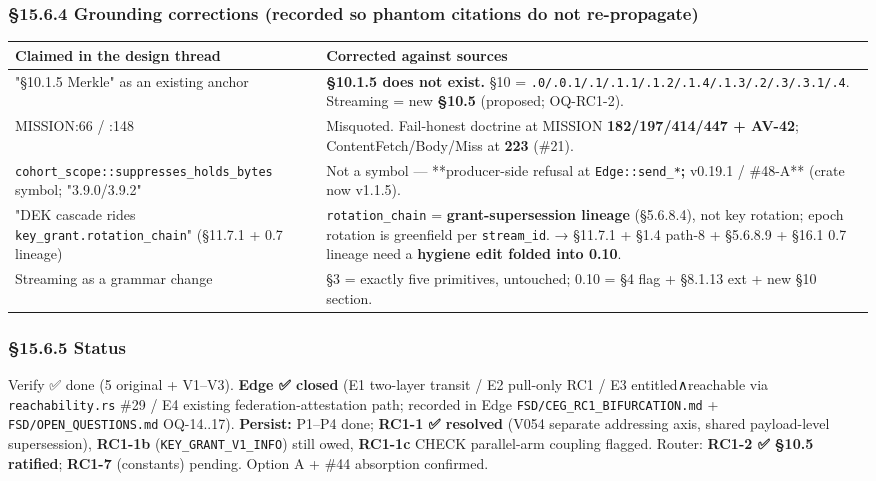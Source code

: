 \documentclass[10pt]{article}
\begin{document}
\subsubsection*{§15.6.4 Grounding corrections (recorded so phantom citations do not re-propagate)}


{\footnotesize
\begin{longtable}{|p{8.0cm}|p{8.0cm}|}\hline
\textbf{Claimed in the design thread} & \textbf{Corrected against sources} \\ \hline\endhead
"§10.1.5 Merkle" as an existing anchor & \textbf{§10.1.5 does not exist.} §10 = \texttt{.0/.0.1/.1/.1.1/.1.2/.1.4/.1.3/.2/.3/.3.1/.4}. Streaming = new \textbf{§10.5} (proposed; OQ-RC1-2). \\ \hline
MISSION:66 / :148 & Misquoted. Fail-honest doctrine at MISSION \textbf{182/197/414/447 + AV-42}; ContentFetch/Body/Miss at \textbf{223} (\#21). \\ \hline
\texttt{cohort\_scope::suppresses\_holds\_bytes} symbol; "3.9.0/3.9.2" & Not a symbol — **producer-side refusal at \texttt{Edge::send\_*}\textbf{; }v0.19.1 / \#48-A** (crate now v1.1.5). \\ \hline
"DEK cascade rides \texttt{key\_grant.rotation\_chain}" (§11.7.1 + 0.7 lineage) & \texttt{rotation\_chain} = \textbf{grant-supersession lineage} (§5.6.8.4), not key rotation; epoch rotation is greenfield per \texttt{stream\_id}. → §11.7.1 + §1.4 path-8 + §5.6.8.9 + §16.1 0.7 lineage need a \textbf{hygiene edit folded into 0.10}. \\ \hline
Streaming as a grammar change & §3 = exactly five primitives, untouched; 0.10 = §4 flag + §8.1.13 ext + new §10 section. \\ \hline
\end{longtable}}


\subsubsection*{§15.6.5 Status}


Verify ✅ done (5 original + V1–V3). \textbf{Edge ✅ closed} (E1 two-layer transit / E2 pull-only RC1 / E3 entitled∧reachable via \texttt{reachability.rs} \#29 / E4 existing federation-attestation path; recorded in Edge \texttt{FSD/CEG\_RC1\_BIFURCATION.md} + \texttt{FSD/OPEN\_QUESTIONS.md} OQ-14..17). \textbf{Persist:} P1–P4 done; \textbf{RC1-1 ✅ resolved} (V054 separate addressing axis, shared payload-level supersession), \textbf{RC1-1b} (\texttt{KEY\_GRANT\_V1\_INFO}) still owed, \textbf{RC1-1c} CHECK parallel-arm coupling flagged. Router: \textbf{RC1-2 ✅ §10.5 ratified}; \textbf{RC1-7} (constants) pending. Option A + \#44 absorption confirmed.
\end{document}
